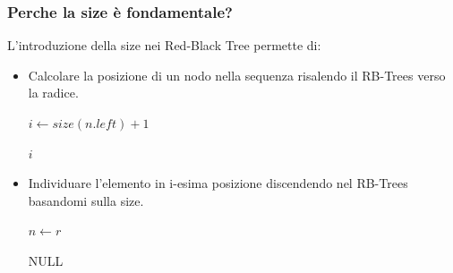\subsubsection{Perche la size è fondamentale?}
L'introduzione della size nei Red-Black Tree permette di:
\begin{itemize}
    \item {Calcolare la posizione di un nodo nella sequenza risalendo il RB-Trees verso la radice.
        
        \begin{algorithm}[H]
            \caption{Posizione del nodo nella sequenza}
            \label{alg:find_i}
            \SetAlgoLined
            \DontPrintSemicolon
            
            
            \BlankLine 
            $i \leftarrow size(n.left) + 1$\;


            \Return $i$
        \end{algorithm}
    }   

    \item {Individuare l'elemento in i-esima posizione discendendo nel RB-Trees basandomi sulla size.
        
    \begin{algorithm}[H]
        \caption{Nodo in posizione i-esima}
        \label{alg:find_i-esimo}
        \SetAlgoLined
        \DontPrintSemicolon
        
        
        \BlankLine 
        $n \leftarrow r$\;
        
        
        \Return NULL 
    \end{algorithm}
    }
\end{itemize}


